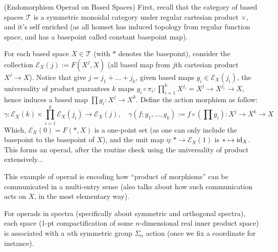 \documentclass{article}
\begin{document}
\begin{exmp}
    (Endomorphism Operad on Based Spaces) First, recall that the category of based spaces $\mathcal{T}$ is a symmetric monoidal category under regular cartesian product $\times$, and it's self enriched (as all homset has induced topology from regular function space, and has a basepoint called constant basepoint map).
    
    For each based space $X\in\mathcal{T}$ (with $*$ denotes the basepoint), consider the collection $\mathcal{E}_X (j):= F(X^j,X)$ (all based map from $j$th cartesian product $X^j\rightarrow X$). Notice that give $j=j_1+...+j_k$, given based maps $g_i\in \mathcal{E}_X (j_i)$, the universality of product guarantees $k$ maps $g_i\circ \pi_i: \prod_{i=1}^k X^{j_i} = X^j \rightarrow X^{j_i}\rightarrow X$, hence induces a based map $\prod g_i:X^j\rightarrow X^k$. Define the action morphism as follow:
    \[\gamma:\mathcal{E}_X (k)\times \prod_{i=1}^k \mathcal{E}_X (j_i)\rightarrow \mathcal{E}_X (j),\quad \gamma(f; g_1,...,g_k):= f\circ (\prod g_i):X^j\rightarrow X^k\rightarrow X\]
    Which, $\mathcal{E}_X (0) = F(*,X)$ is a one-point set (as one can only include the basepoint to the basepoint of $X$), and the unit map $\eta:*\rightarrow \mathcal{E}_X (1)$ is $*\mapsto \mathrm{id}_X$. This forms an operad, after the routine check using the universality of product extensively...
\end{exmp}
This example of operad is encoding how ``product of morphisms'' can be communicated in a multi-entry sense (also talks about how such communication acts on $X$, in the most elementary way).

\hfil

For operads in spectra (specifically about symmetric and orthogonal spectra), each space (1-pt compactification of some $n$-dimensional real inner product space) is associated with a $n$th symmetric group $\Sigma_n$ action (once we fix a coordinate for instance).
\end{document}
